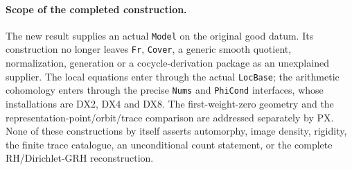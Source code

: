 \paragraph{Scope of the completed construction.}
The new result supplies an actual \texttt{Model} on the
original good datum.  Its construction no longer leaves
\texttt{Fr}, \texttt{Cover}, a generic smooth quotient,
normalization, generation or a cocycle-derivation package
as an unexplained supplier.  The local equations enter
through the actual \texttt{LocBase}; the arithmetic
cohomology enters through the precise \texttt{Nums} and
\texttt{PhiCond} interfaces, whose installations are DX2,
DX4 and DX8.  The first-weight-zero geometry and the
representation-point/orbit/trace comparison are addressed
separately by PX.  None of these constructions by itself
asserts automorphy, image density, rigidity, the finite
trace catalogue, an unconditional count statement, or the
complete RH/Dirichlet-GRH reconstruction.
